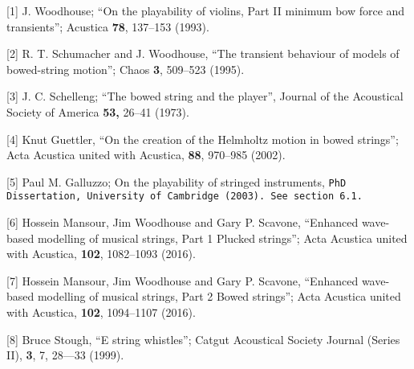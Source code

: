   \sectionreferences{}[1] J. Woodhouse; ``On the playability of violins, Part 
  II minimum bow force and transients''; Acustica \textbf{78}, 137--153 (1993). 

  [2] R. T. Schumacher and J. Woodhouse, ``The transient behaviour of models of 
  bowed-string motion''; Chaos \textbf{3}, 509--523 (1995). 

  [3] J. C. Schelleng; ``The bowed string and the player'', Journal of the 
  Acoustical Society of America \textbf{53, }26–41 (1973). 

  [4] Knut Guettler, ``On the creation of the Helmholtz motion in bowed 
  strings''; Acta Acustica united with Acustica, \textbf{88}, 970--985 (2002). 

  [5] Paul M. Galluzzo; On the playability of stringed instruments, \tt{}PhD 
  Dissertation\rm{}, University of Cambridge (2003). See section 6.1. 

  [6] Hossein Mansour, Jim Woodhouse and Gary P. Scavone, ``Enhanced wave-based 
  modelling of musical strings, Part 1 Plucked strings''; Acta Acustica united 
  with Acustica, \textbf{102}, 1082--1093 (2016). 

  [7] Hossein Mansour, Jim Woodhouse and Gary P. Scavone, ``Enhanced wave-based 
  modelling of musical strings, Part 2 Bowed strings''; Acta Acustica united 
  with Acustica, \textbf{102}, 1094--1107 (2016). 

  [8] Bruce Stough, “E string whistles”; Catgut Acoustical Society Journal 
  (Series II), \textbf{3}, 7, 28—33 (1999). 